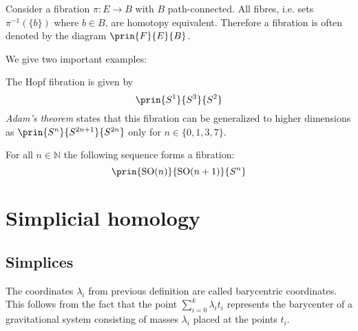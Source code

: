 	\begin{property}
		Consider a fibration $\pi:E\rightarrow B$ with $B$ path-connected. All fibres, i.e. sets $\pi^{-1}(\{b\})$ where $b\in B$, are homotopy equivalent. Therefore a fibration is often denoted by the diagram $\prin{F}{E}{B}$.
	\end{property}
	
	We give two important examples:
	\begin{example}
		The Hopf fibration is given by
		\begin{equation}
			\prin{S^1}{S^3}{S^2}
		\end{equation}
		\textit{Adam's theorem} states that this fibration can be generalized to higher dimensions as $\prin{S^n}{S^{2n+1}}{S^{2n}}$ only for $n\in\{0, 1, 3, 7\}$.
	\end{example}
	\begin{example}
		For all $n\in\mathbb{N}$ the following sequence forms a fibration:
		\begin{equation}
			\prin{\text{SO}(n)}{\text{SO}(n+1)}{S^n}
		\end{equation}
	\end{example}
	
\section{Simplicial homology}\label{section:homology}
\subsection{Simplices}

	\begin{remark}
		The coordinates $\lambda_i$ from previous definition are called barycentric coordinates. This follows from the fact that the point $\sum_{i=0}^k\lambda_it_i$ represents the barycenter of a gravitational system consisting of masses $\lambda_i$ placed at the points $t_i$.
	\end{remark}
	
